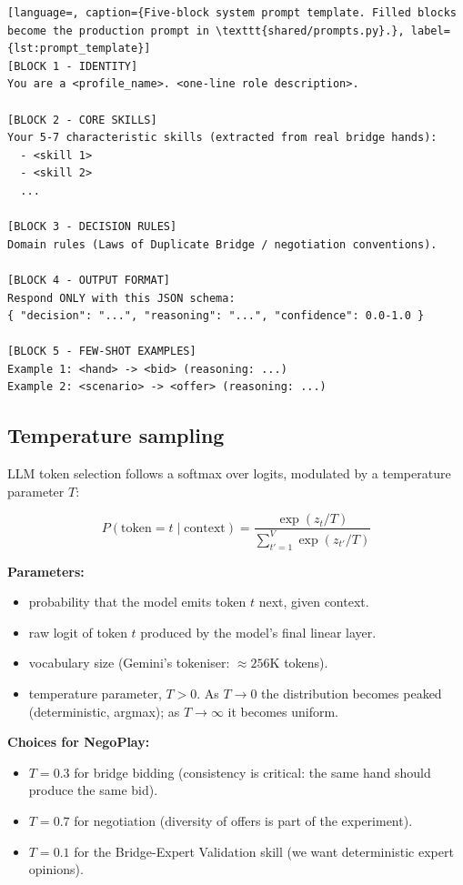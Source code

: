 \documentclass[11pt, a4paper, oneside, openany]{report}
\begin{document}
\begin{lstlisting}[language=, caption={Five-block system prompt template. Filled blocks become the production prompt in \texttt{shared/prompts.py}.}, label={lst:prompt_template}]
[BLOCK 1 - IDENTITY]
You are a <profile_name>. <one-line role description>.

[BLOCK 2 - CORE SKILLS]
Your 5-7 characteristic skills (extracted from real bridge hands):
  - <skill 1>
  - <skill 2>
  ...

[BLOCK 3 - DECISION RULES]
Domain rules (Laws of Duplicate Bridge / negotiation conventions).

[BLOCK 4 - OUTPUT FORMAT]
Respond ONLY with this JSON schema:
{ "decision": "...", "reasoning": "...", "confidence": 0.0-1.0 }

[BLOCK 5 - FEW-SHOT EXAMPLES]
Example 1: <hand> -> <bid> (reasoning: ...)
Example 2: <scenario> -> <offer> (reasoning: ...)
\end{lstlisting}

\subsection{Temperature sampling}

LLM token selection follows a softmax over logits, modulated by a temperature parameter $T$:

\begin{equation}
\label{eq:softmax_temperature}
P(\text{token} = t \mid \text{context}) = \frac{\exp(z_t / T)}{\sum_{t' = 1}^{V} \exp(z_{t'} / T)}
\end{equation}

\noindent\textbf{Parameters:}
\begin{itemize}[leftmargin=2.2cm, itemsep=0pt, topsep=2pt]
    \item[$P(t \mid \text{ctx})$] probability that the model emits token $t$ next, given context.
    \item[$z_t$] raw logit of token $t$ produced by the model's final linear layer.
    \item[$V$] vocabulary size (Gemini's tokeniser: $\approx 256\text{K}$ tokens).
    \item[$T$] temperature parameter, $T > 0$. As $T \to 0$ the distribution becomes peaked (deterministic, argmax); as $T \to \infty$ it becomes uniform.
\end{itemize}

\noindent\textbf{Choices for NegoPlay:}
\begin{itemize}[leftmargin=*]
    \item $T = 0.3$ for bridge bidding (consistency is critical: the same hand should produce the same bid).
    \item $T = 0.7$ for negotiation (diversity of offers is part of the experiment).
    \item $T = 0.1$ for the Bridge-Expert Validation skill (we want deterministic expert opinions).
\end{itemize}
\end{document}
